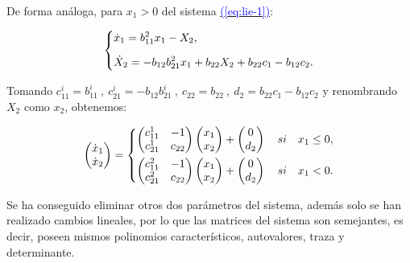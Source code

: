 \documentclass[12pt,a4paper]{report} %
\newcommand{\eref}[1]{\hyperref[#1]{\textcolor{blue}{(\ref*{#1})}}}
\newcommand{\eref}[1]{\hyperref[#1]{\textcolor{blue}{\textit{(\ref*{#1})}}}}
\begin{document}
	\noindent De forma análoga, para $x_1>0$ del sistema \eref{eq:lie-1}:
	
	\begin{equation}
		\label{eq:q2}
		\scalebox{1}{$\displaystyle
			\left\{
			\begin{aligned}
			&\dot{x}_1=b_{11}^2x_1-X_2, \\[2mm]
			&\dot{X}_2=-b_{12}b_{21}^2x_1+b_{22}X_2+b_{22}c_1-b_{12}c_2.
		\end{aligned}
		\right.
		$}
	\end{equation}\smallskip
	
	\noindent Tomando $c_{11}^i=b_{11}^i \: , \: c_{21}^i=-b_{12}b_{21}^i \: , \: c_{22}=b_{22} \: , \: d_2=b_{22}c_1-b_{12}c_2$ y renombrando $X_2$ como $x_2$, obtenemos:
	
	\begin{equation}
		\begin{pmatrix*}[r]
			\dot{x}_1 \\ \dot{x}_2
		\end{pmatrix*}=
		\label{eq:lie-12}
		\scalebox{1}{$\displaystyle
			\left\{
			\begin{aligned}
				\begin{pmatrix*}[r]
					c_{11}^1 & -1 \\
					c_{21}^1 & c_{22}
				\end{pmatrix*}\begin{pmatrix*}[r]
				x_1\\x_2
				\end{pmatrix*}+\begin{pmatrix*}[c]
				0 \\ d_2
				\end{pmatrix*} \quad si \quad x_1 \leq 0, \\
				\begin{pmatrix*}[r]
					c_{11}^2 & -1 \\
					c_{21}^2 & c_{22}
				\end{pmatrix*}\begin{pmatrix*}[r]
				x_1\\x_2
				\end{pmatrix*}+\begin{pmatrix*}[c]
				0 \\ d_2
				\end{pmatrix*} \quad si \quad x_1 < 0.
			\end{aligned}
			\right.
			$} 
	\end{equation}\smallskip
	
	\noindent Se ha conseguido eliminar otros dos parámetros del sistema, además solo se han realizado cambios lineales, por lo que las matrices del sistema son semejantes, es decir, poseen mismos polinomios característicos, autovalores, traza y determinante.
	
\end{document}
